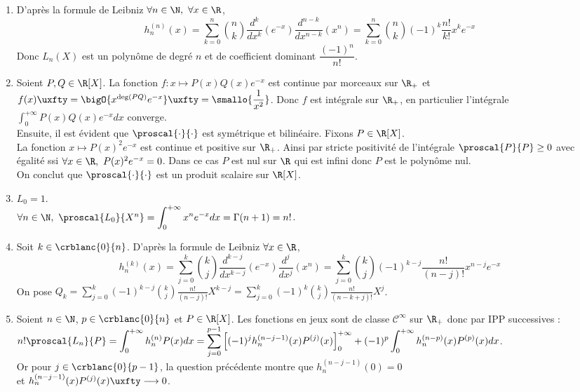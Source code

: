 \documentclass{book}
\begin{document}
	\begin{enumerate}[leftmargin=*]
		\item D'après la formule de Leibniz $\forall n\in \N,\ \forall x\in \R$,
		$$h_n^{(n)}(x)=\sum_{k=0}^n\binom{n}{k}\frac{d^k}{dx^k}(e^{-x})\frac{d^{n-k}}{dx^{n-k}}(x^n)=\sum_{k=0}^n\binom{n}{k}(-1)^k\frac{n!}{k!}x^ke^{-x}$$
		Donc $L_n(X)$ est un polynôme de degré $n$ et de coefficient dominant $\dfrac{(-1)^n}{n!}$.
		\item Soient $P,Q\in \R[X]$. La fonction $f:x\mapsto P(x)Q(x)e^{-x}$ est continue par morceaux sur $\R_+$ et $f(x)\uxfty=\bigO{x^{\deg(PQ)}e^{-x}}\uxfty=\smallo{\dfrac{1}{x^2}}$. Donc $f$ est intégrale sur $\R_+$, en particulier l'intégrale $\displaystyle\int_0^{+\infty}P(x)Q(x)e^{-x}dx$ converge.\\
		Ensuite, il est évident que $\proscal{\cdot}{\cdot}$ est symétrique et bilinéaire. Fixons $P\in \R[X]$.\\
		La fonction $x\mapsto P(x)^2e^{-x}$ est continue et positive sur $\R_+$. Ainsi par stricte positivité de l'intégrale $\proscal{P}{P}\geq 0$ avec égalité ssi $\forall x\in \R,\ P(x)^2e^{-x}=0$. Dans ce cas $P$ est nul sur $\R$ qui est infini donc $P$ est le polynôme nul.\\
		On conclut que $\proscal{\cdot}{\cdot}$ est un produit scalaire sur $\R[X]$.
		\item $L_0=1$.\\
		$\forall n\in \N,\ \proscal{L_0}{X^n}=\displaystyle\int_0^{+\infty}x^ne^{-x}dx=\Gamma(n+1)=n!$.
		\item Soit $k\in \crblanc{0}{n}$. D'après la formule de Leibniz $\forall x\in \R$,
		$$h_n^{(k)}(x)=\sum_{j=0}^k\binom{k}{j}\frac{d^{k-j}}{dx^{k-j}}(e^{-x})\frac{d^j}{dx^j}(x^n)=\sum_{j=0}^k\binom{k}{j}(-1)^{k-j}\frac{n!}{(n-j)!}x^{n-j}e^{-x}$$
		On pose $Q_k=\displaystyle\sum_{j=0}^k(-1)^{k-j}\binom{k}{j}\frac{n!}{(n-j)!}X^{k-j}=\sum_{j=0}^k(-1)^k\binom{k}{j}\frac{n!}{(n-k+j)!}X^j$.
		\item Soient $n\in \N$, $p\in \crblanc{0}{n}$ et $P\in \R[X]$. Les fonctions en jeux sont de classe $\mathcal C^\infty$ sur $\R_+$ donc par IPP successives :\\
		$n!\proscal{L_n}{P}=\displaystyle\int_0^{+\infty}h_n^{(n)}P(x)dx=\sum_{j=0}^{p-1}\left[(-1)^jh_n^{(n-j-1)}(x)P^{(j)}(x)\right]_0^{+\infty}+(-1)^p\int_0^{+\infty}h_n^{(n-p)}(x)P^{(p)}(x)dx$.\\
		Or pour $j\in \crblanc{0}{p-1}$, la question précédente montre que $h_n^{(n-j-1)}(0)=0$\\
		et $h_n^{(n-j-1)}(x)P^{(j)}(x)\uxfty\longrightarrow0$.\\

\end{enumerate}
\end{document}
